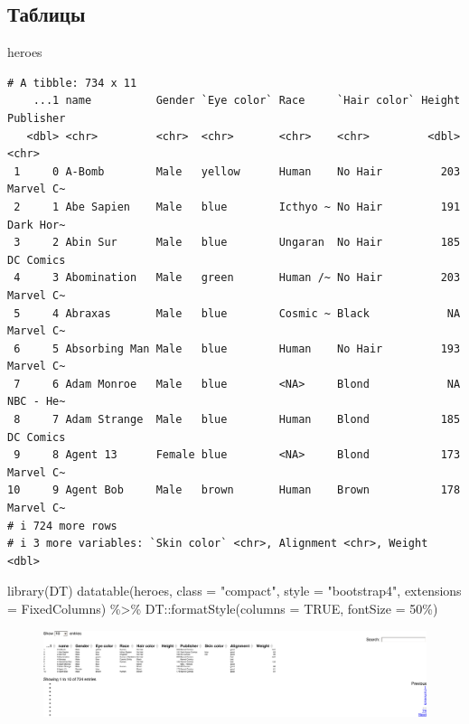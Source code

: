 \documentclass[
  letterpaper,
  DIV=11,
  numbers=noendperiod]{scrartcl}
\newenvironment{Shaded}{\begin{snugshade}}{\end{snugshade}}
\newcommand{\AttributeTok}[1]{\textcolor[rgb]{0.40,0.45,0.13}{#1}}
\newcommand{\ConstantTok}[1]{\textcolor[rgb]{0.56,0.35,0.01}{#1}}
\newcommand{\FunctionTok}[1]{\textcolor[rgb]{0.28,0.35,0.67}{#1}}
\newcommand{\NormalTok}[1]{\textcolor[rgb]{0.00,0.23,0.31}{#1}}
\newcommand{\SpecialCharTok}[1]{\textcolor[rgb]{0.37,0.37,0.37}{#1}}
\newcommand{\StringTok}[1]{\textcolor[rgb]{0.13,0.47,0.30}{#1}}
\begin{document}
\hypertarget{ux442ux430ux431ux43bux438ux446ux44b}{%
\subsection{Таблицы}\label{ux442ux430ux431ux43bux438ux446ux44b}}

\begin{Shaded}
\begin{Highlighting}[]
\NormalTok{heroes}
\end{Highlighting}
\end{Shaded}

\begin{verbatim}
# A tibble: 734 x 11
    ...1 name          Gender `Eye color` Race     `Hair color` Height Publisher
   <dbl> <chr>         <chr>  <chr>       <chr>    <chr>         <dbl> <chr>    
 1     0 A-Bomb        Male   yellow      Human    No Hair         203 Marvel C~
 2     1 Abe Sapien    Male   blue        Icthyo ~ No Hair         191 Dark Hor~
 3     2 Abin Sur      Male   blue        Ungaran  No Hair         185 DC Comics
 4     3 Abomination   Male   green       Human /~ No Hair         203 Marvel C~
 5     4 Abraxas       Male   blue        Cosmic ~ Black            NA Marvel C~
 6     5 Absorbing Man Male   blue        Human    No Hair         193 Marvel C~
 7     6 Adam Monroe   Male   blue        <NA>     Blond            NA NBC - He~
 8     7 Adam Strange  Male   blue        Human    Blond           185 DC Comics
 9     8 Agent 13      Female blue        <NA>     Blond           173 Marvel C~
10     9 Agent Bob     Male   brown       Human    Brown           178 Marvel C~
# i 724 more rows
# i 3 more variables: `Skin color` <chr>, Alignment <chr>, Weight <dbl>
\end{verbatim}

\begin{Shaded}
\begin{Highlighting}[]
\FunctionTok{library}\NormalTok{(DT)}
\FunctionTok{datatable}\NormalTok{(heroes, }
          \AttributeTok{class =} \StringTok{"compact"}\NormalTok{,}
          \AttributeTok{style =} \StringTok{"bootstrap4"}\NormalTok{,}
          \AttributeTok{extensions =} \StringTok{\textquotesingle{}FixedColumns\textquotesingle{}}\NormalTok{) }\SpecialCharTok{\%\textgreater{}\%}
\NormalTok{  DT}\SpecialCharTok{::}\FunctionTok{formatStyle}\NormalTok{(}\AttributeTok{columns =} \ConstantTok{TRUE}\NormalTok{, }\AttributeTok{fontSize =} \StringTok{\textquotesingle{}50\%\textquotesingle{}}\NormalTok{)}
\end{Highlighting}
\end{Shaded}

\begin{figure}[H]

{\centering \includegraphics{smaller_autumn_quarto_files/figure-pdf/unnamed-chunk-6-1.pdf}

}

\end{figure}
\end{document}
